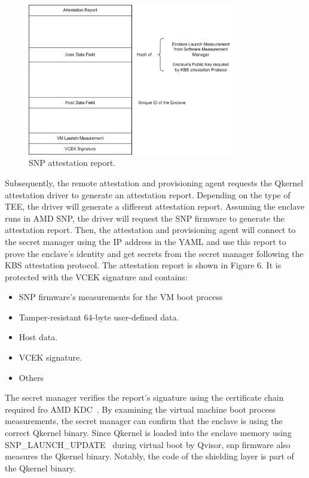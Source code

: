 \begin{figure}[H]
    \centering
    \includegraphics[width=0.8\textwidth]{images/attestation_report_format.png}
    \caption[SNP attestation report]{SNP attestation report.}
    \label{fig:attestation_report_format}
\end{figure}

Subsequently, the remote attestation and provisioning agent requests the Qkernel attestation driver to generate an attestation report. Depending on the type of TEE, the driver will generate a different attestation report. Assuming the enclave runs 
in AMD SNP, the driver will request the SNP firmware to generate the attestation report. Then, the attestation and provisioning agent will connect to the secret manager using the IP address in the YAML and use this report to prove the enclave's 
identity and get secrets from the secret manager following the KBS attestation protocol. The attestation report is shown in Figure 6. It is protected with the VCEK signature and contains:
\begin{itemize}
    \item SNP firmware's measurements for the VM boot process
    \item Tamper-resistant 64-byte user-defined data.
    \item Host data.
    \item VCEK signature.
    \item Others
\end{itemize}


The secret manager verifies the report's signature using the certificate chain required fro AMD KDC~\cite*{snp_kdc}. By examining the virtual machine boot process measurements, the secret manager can confirm that the enclave is using the correct Qkernel binary. 
Since Qkernel is loaded into the enclave memory using SNP\_LAUNCH\_UPDATE~\cite*{snp_firmware} during virtual boot by Qvisor, snp firmware also measures the Qkernel binary. Notably, the code of the shielding layer is part of the Qkernel binary.

